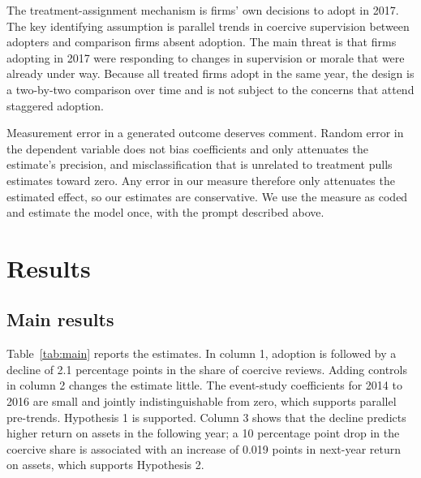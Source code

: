 \documentclass[12pt]{article}
\begin{document}
The treatment-assignment mechanism is firms' own decisions to adopt in 2017. The key identifying assumption is parallel trends in coercive supervision between adopters and comparison firms absent adoption. The main threat is that firms adopting in 2017 were responding to changes in supervision or morale that were already under way. Because all treated firms adopt in the same year, the design is a two-by-two comparison over time and is not subject to the concerns that attend staggered adoption.

Measurement error in a generated outcome deserves comment. Random error in the dependent variable does not bias coefficients and only attenuates the estimate's precision, and misclassification that is unrelated to treatment pulls estimates toward zero. Any error in our measure therefore only attenuates the estimated effect, so our estimates are conservative. We use the measure as coded and estimate the model once, with the prompt described above.

\section{Results}
\subsection{Main results}
Table~\ref{tab:main} reports the estimates. In column 1, adoption is followed by a decline of 2.1 percentage points in the share of coercive reviews. Adding controls in column 2 changes the estimate little. The event-study coefficients for 2014 to 2016 are small and jointly indistinguishable from zero, which supports parallel pre-trends. Hypothesis 1 is supported. Column 3 shows that the decline predicts higher return on assets in the following year; a 10 percentage point drop in the coercive share is associated with an increase of 0.019 points in next-year return on assets, which supports Hypothesis 2.
\end{document}
